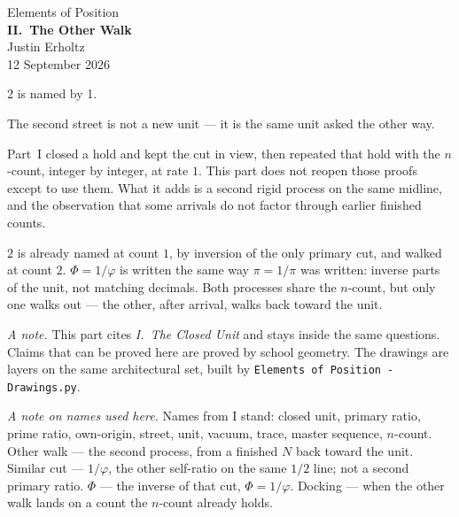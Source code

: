 \documentclass[10pt,a4paper]{article}
\theoremstyle{plain}
\theoremstyle{definition}
\theoremstyle{remark}
\begin{document}
\begin{center}
\vspace*{2.2em}
{\large Elements of Position}\\[1.6em]
{\LARGE\bfseries II.\ The Other Walk}\\[2.2em]
{\normalsize Justin Erholtz}\\[0.35em]
{\small 12 September 2026}
\end{center}

\vspace{2.4em}

\begin{center}
{\large 2 is named by 1.}
\end{center}

\vspace{1.8em}

\noindent
The second street is not a new unit --- it is the same unit asked the other way.

Part~I closed a hold and kept the cut in view, then repeated that hold with the $n$-count, integer by integer, at rate $1$.
This part does not reopen those proofs except to use them.
What it adds is a second rigid process on the same midline, and the observation that some arrivals do not factor through earlier finished counts.

$2$ is already named at count $1$, by inversion of the only primary cut, and walked at count $2$.
$\Phi=1/\varphi$ is written the same way $\pi=1/\pi$ was written: inverse parts of the unit, not matching decimals.
Both processes share the $n$-count, but only one walks out --- the other, after arrival, walks back toward the unit.

\vspace{1.4em}

\noindent
\textit{A note.}
This part cites \emph{I.\ The Closed Unit} and stays inside the same questions.
Claims that can be proved here are proved by school geometry.
The drawings are layers on the same architectural set, built by \texttt{Elements of Position - Drawings.py}.

\vspace{0.9em}
\noindent
\textit{A note on names used here.}
Names from I stand: closed unit, primary ratio, prime ratio, own-origin, street, unit, vacuum, trace, master sequence, $n$-count.
Other walk --- the second process, from a finished $N$ back toward the unit.
Similar cut --- $1/\varphi$, the other self-ratio on the same $1/2$ line; not a second primary ratio.
$\Phi$ --- the inverse of that cut, $\Phi=1/\varphi$.
Docking --- when the other walk lands on a count the $n$-count already holds.
\end{document}
